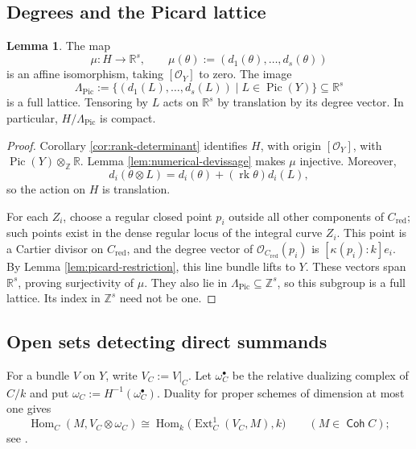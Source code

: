 \documentclass[a4paper,reqno]{amsart}
\def\O{\mathcal{O}}
\def\La{\Lambda}
\DeclareMathOperator{\Coh}{\mathsf{Coh}}
\DeclareMathOperator{\Hom}{Hom}
\DeclareMathOperator{\Ext}{Ext}
\DeclareMathOperator{\Pic}{Pic}
\DeclareMathOperator{\rk}{rk}
\theoremstyle{definition}
\newtheorem{Lem}[Thm]{Lemma}
\begin{document}
\subsection{Degrees and the Picard lattice}

\begin{Lem}\label{lem:picard-lattice}
The map
\[
\mu\colon H\longrightarrow\mathbb R^s,\qquad
\mu(\theta):=(d_1(\theta),\ldots,d_s(\theta))
\]
is an affine isomorphism, taking $[\O_Y]$ to zero. The image
\[
\La_{\mathrm{Pic}}:=\{(d_1(L),\ldots,d_s(L))\mid L\in\Pic(Y)\}\subseteq\mathbb R^s
\]
is a full lattice. Tensoring by $L$ acts on $\mathbb R^s$ by translation by its degree vector. In particular, $H/\La_{\mathrm{Pic}}$ is compact.
\end{Lem}
\begin{proof}
Corollary \ref{cor:rank-determinant} identifies $H$, with origin $[\O_Y]$, with $\Pic(Y)\otimes_{\mathbb Z}\mathbb R$. Lemma \ref{lem:numerical-devissage} makes $\mu$ injective. Moreover,
\[
d_i(\theta\otimes L)=d_i(\theta)+(\rk\theta)d_i(L),
\]
so the action on $H$ is translation.

For each $Z_i$, choose a regular closed point $p_i$ outside all other components of $C_{\mathrm{red}}$; such points exist in the dense regular locus of the integral curve $Z_i$. This point is a Cartier divisor on $C_{\mathrm{red}}$, and the degree vector of $\O_{C_{\mathrm{red}}}(p_i)$ is $[\kappa(p_i):k]e_i$. By Lemma \ref{lem:picard-restriction}, this line bundle lifts to $Y$. These vectors span $\mathbb R^s$, proving surjectivity of $\mu$. They also lie in $\La_{\mathrm{Pic}}\subseteq\mathbb Z^s$, so this subgroup is a full lattice. Its index in $\mathbb Z^s$ need not be one.
\end{proof}

\subsection{Open sets detecting direct summands}

For a bundle $V$ on $Y$, write $V_C:=V|_C$. Let $\omega_C^\bullet$ be the relative dualizing complex of $C/k$ and put $\omega_C:=H^{-1}(\omega_C^\bullet)$. Duality for proper schemes of dimension at most one gives
\begin{equation}\label{eq:closed-fibre-duality}
\Hom_C(M,V_C\otimes\omega_C)
\cong\Hom_k\bigl(\Ext_C^1(V_C,M),k\bigr)
\qquad(M\in\Coh C);
\end{equation}
see \cite[Tag 0BS2]{stacks-project}.
\end{document}
